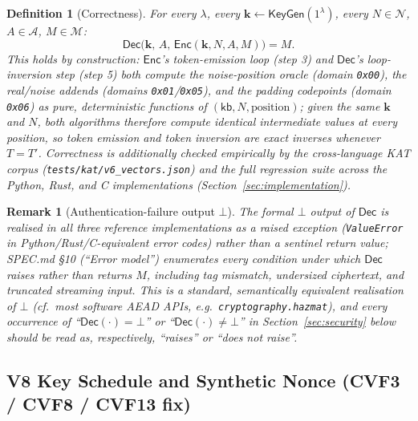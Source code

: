 \documentclass[11pt,a4paper]{article}
\newtheorem{definition}[theorem]{Definition}
\newtheorem{remark}[theorem]{Remark}
\begin{document}
\begin{definition}[Correctness]\label{def:correctness}
For every $\lambda$, every $\mathbf{k} \gets \mathsf{KeyGen}(1^{\lambda})$,
every $N\in\mathcal{N}$, $A\in\mathcal{A}$, $M\in\mathcal{M}$:
\[
  \mathsf{Dec}\bigl(\mathbf{k},\, A,\, \mathsf{Enc}(\mathbf{k}, N, A, M)\bigr) = M.
\]
This holds by construction: $\mathsf{Enc}$'s token-emission loop (step 3)
and $\mathsf{Dec}$'s loop-inversion step (step 5) both compute the
noise-position oracle (domain \texttt{0x00}), the real/noise addends
(domains \texttt{0x01}/\texttt{0x05}), and the padding codepoints (domain
\texttt{0x06}) as pure, deterministic functions of $(\mathsf{kb}, N,
\mathrm{position})$; given the same $\mathbf{k}$ and $N$, both algorithms
therefore compute identical intermediate values at every position, so
token emission and token inversion are exact inverses whenever $T = T'$.
Correctness is additionally checked empirically by the cross-language KAT
corpus (\texttt{tests/kat/v6\_vectors.json}) and the full regression suite
across the Python, Rust, and C implementations
(Section~\ref{sec:implementation}).
\end{definition}

\begin{remark}[Authentication-failure output $\bot$]
The formal $\bot$ output of $\mathsf{Dec}$ is realised in all three
reference implementations as a raised exception
(\texttt{ValueError} in Python/Rust/C-equivalent error codes) rather than a
sentinel return value; SPEC.md \S10 (``Error model'') enumerates every
condition under which $\mathsf{Dec}$ raises rather than returns $M$,
including tag mismatch, undersized ciphertext, and truncated streaming
input. This is a standard, semantically equivalent realisation of $\bot$
(cf.\ most software AEAD APIs, e.g.\ \texttt{cryptography.hazmat}), and every
occurrence of ``$\mathsf{Dec}(\cdot)=\bot$'' or
``$\mathsf{Dec}(\cdot)\neq\bot$'' in Section~\ref{sec:security} below
should be read as, respectively, ``raises'' or ``does not raise''.
\end{remark}

\subsection{V8 Key Schedule and Synthetic Nonce (CVF3 / CVF8 / CVF13 fix)}
\label{sec:v8}
\end{document}
